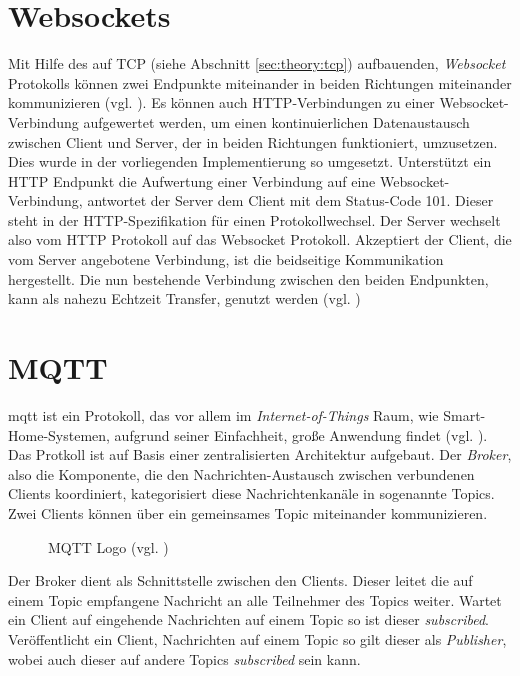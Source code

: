 \section{Websockets}\label{sec:theory:ws}
Mit Hilfe des auf TCP (siehe Abschnitt \ref{sec:theory:tcp}) aufbauenden, \textit{Websocket} Protokolls können zwei Endpunkte miteinander in beiden Richtungen miteinander kommunizieren (vgl. \cite{src:ionos:websocket}). Es können auch HTTP-Verbindungen zu einer Websocket-Verbindung aufgewertet werden, um einen kontinuierlichen Datenaustausch zwischen Client und Server, der in beiden Richtungen funktioniert, umzusetzen. Dies wurde in der vorliegenden Implementierung so umgesetzt. Unterstützt ein HTTP Endpunkt die Aufwertung einer Verbindung auf eine Websocket-Verbindung, antwortet der Server dem Client mit dem Status-Code 101. Dieser steht in der HTTP-Spezifikation für einen Protokollwechsel. Der Server wechselt also vom HTTP Protokoll auf das Websocket Protokoll. Akzeptiert der Client, die vom Server angebotene Verbindung, ist die beidseitige Kommunikation hergestellt. Die nun bestehende Verbindung zwischen den beiden Endpunkten, kann als nahezu Echtzeit Transfer, genutzt werden (vgl. \cite{rfc:websocket})

\section{MQTT}\label{sec:theory:mqtt}
\acrshort{mqtt} ist ein Protokoll, das vor allem im \textit{Internet-of-Things} Raum, wie Smart-Home-Systemen, aufgrund seiner Einfachheit, große Anwendung findet (vgl. \cite{src:therory:mqtt}). Das Protkoll ist auf Basis einer zentralisierten Architektur aufgebaut. Der \textit{Broker}, also die Komponente, die den Nachrichten-Austausch zwischen verbundenen Clients koordiniert, kategorisiert diese Nachrichtenkanäle in sogenannte Topics. Zwei Clients können über ein gemeinsames Topic miteinander kommunizieren.   
\begin{figure}[h!]
    \centering
    
    \caption{MQTT Logo (vgl. \cite{MqttLogo})}
\end{figure}
Der Broker dient als Schnittstelle zwischen den Clients. Dieser leitet die auf einem Topic empfangene Nachricht an alle Teilnehmer des Topics weiter. Wartet ein Client auf eingehende Nachrichten auf einem Topic so ist dieser \textit{subscribed}. Veröffentlicht ein Client, Nachrichten auf einem Topic so gilt dieser als \textit{Publisher}, wobei auch dieser auf andere Topics \textit{subscribed} sein kann. 

